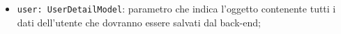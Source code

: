 \begin{itemize}
\begin{itemize}
		\begin{itemize}
			\item \texttt{user: UserDetailModel}: parametro che indica l'oggetto contenente tutti i dati dell'utente che dovranno essere salvati dal back-end;
		\end{itemize}
	
	\end{itemize}
\end{itemize}

